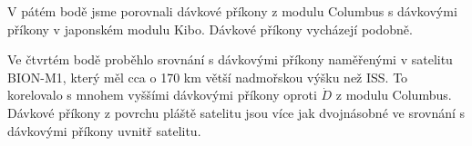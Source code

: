  V pátém bodě jsme porovnali dávkové příkony z modulu Columbus s dávkovými příkony v japonském modulu Kibo. Dávkové příkony vycházejí podobně.

 Ve čtvrtém bodě proběhlo srovnání s dávkovými příkony naměřenými v satelitu BION-M1, který měl cca o 170 km větší nadmořskou výšku než ISS. To korelovalo s mnohem vyššími dávkovými příkony oproti $\dot{D}$ z modulu Columbus. Dávkové příkony z povrchu pláště satelitu jsou více jak dvojnásobné ve srovnání s dávkovými příkony uvnitř satelitu.



